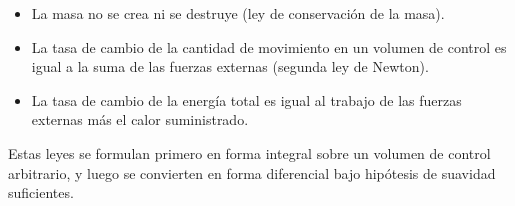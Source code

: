 \documentclass[12pt,a4paper]{article}
\begin{document}
\begin{itemize}
  \item La masa no se crea ni se destruye (ley de conservación de la masa).
  \item La tasa de cambio de la cantidad de movimiento en un volumen de control es igual a la suma de las fuerzas externas (segunda ley de Newton).
  \item La tasa de cambio de la energía total es igual al trabajo de las fuerzas externas más el calor suministrado.
\end{itemize}

Estas leyes se formulan primero en forma integral sobre un volumen de control arbitrario, y luego se convierten en forma diferencial bajo hipótesis de suavidad suficientes.
\end{document}
